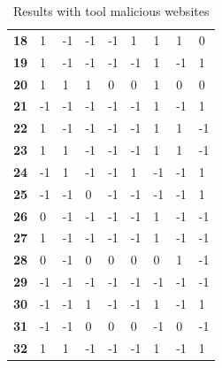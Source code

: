 \documentclass[twoside,openright,notitlepage]{uva-bachelor-thesis}
\begin{document}
\begin{table}[h!]
{\begin{tabular}{lllllllll}
\textbf{18} & 1  & -1 & -1 & -1 & 1  & 1  & 1  & 0  \\
\textbf{19} & 1  & -1 & -1 & -1 & -1 & 1  & -1 & 1  \\
\textbf{20} & 1  & 1  & 1  & 0  & 0  & 1  & 0  & 0  \\
\textbf{21} & -1 & -1 & -1 & -1 & -1 & 1  & -1 & 1  \\
\textbf{22} & 1  & -1 & -1 & -1 & -1 & 1  & 1  & -1 \\
\textbf{23} & 1  & 1  & -1 & -1 & -1 & 1  & 1  & -1 \\
\textbf{24} & -1 & 1  & -1 & -1 & 1  & -1 & -1 & 1  \\
\textbf{25} & -1 & -1 & 0  & -1 & -1 & -1 & -1 & 1  \\
\textbf{26} & 0  & -1 & -1 & -1 & -1 & 1  & -1 & -1 \\
\textbf{27} & 1  & -1 & -1 & -1 & -1 & 1  & -1 & -1 \\
\textbf{28} & 0  & -1 & 0  & 0  & 0  & 0  & 1  & -1 \\
\textbf{29} & -1 & -1 & -1 & -1 & -1 & -1 & -1 & -1 \\
\textbf{30} & -1 & -1 & 1  & -1 & -1 & 1  & -1 & 1  \\
\textbf{31} & -1 & -1 & 0  & 0  & 0  & -1 & 0  & -1 \\
\textbf{32} & 1  & 1  & -1 & -1 & -1 & 1  & -1 & 1 
\end{tabular}
\caption{Results with tool malicious websites}
}
\end{table}
\end{document}

